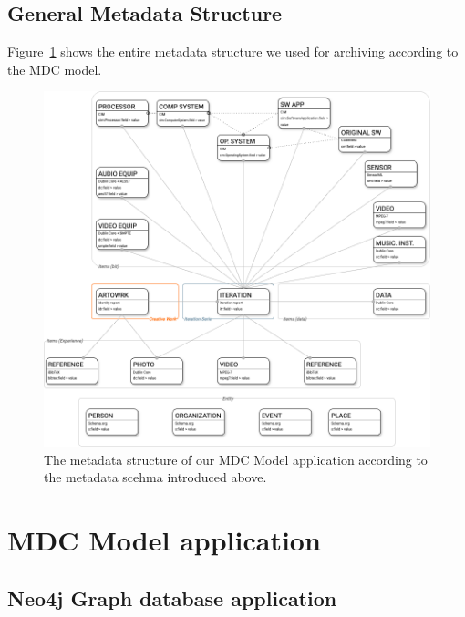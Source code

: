 \subsection{General Metadata Structure}
Figure~\ref{fig:c4-metadata} shows the entire metadata structure we used for archiving according to the MDC model.


\begin{figure}[!h]
    \centering
    \includegraphics[width=\linewidth]{chapters/4-MDC_model_application/image/graph04-metadata.png}
    \caption{The metadata structure of our MDC Model application according to the metadata scehma introduced above.}
    \label{fig:c4-metadata}
\end{figure}

\section{MDC Model application}

\subsection{Neo4j Graph database application}

